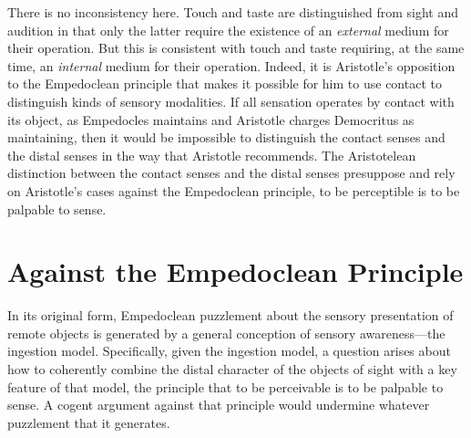 There is no inconsistency here. Touch and taste are distinguished from sight and audition in that only the latter require the existence of an \emph{external} medium for their operation. But this is consistent with touch and taste requiring, at the same time, an \emph{internal} medium for their operation. Indeed, it is Aristotle's opposition to the Empedoclean principle that makes it possible for him to use contact to distinguish kinds of sensory modalities. If all sensation operates by contact with its object, as Empedocles maintains and Aristotle charges Democritus as maintaining, then it would be impossible to distinguish the contact senses and the distal senses in the way that Aristotle recommends. The Aristotelean distinction between the contact senses and the distal senses presuppose and rely on Aristotle's cases against the Empedoclean principle, to be perceptible is to be palpable to sense.



\section{Against the Empedoclean Principle} %
\label{sec:against_the_empedoclean_principle}

In its original form, Empedoclean puzzlement about the sensory presentation of remote objects is generated by a general conception of sensory awareness---the ingestion model. Specifically, given the ingestion model, a question arises about how to coherently combine the distal character of the objects of sight with a key feature of that model, the principle that to be perceivable is to be palpable to sense. A cogent argument against that principle would undermine whatever puzzlement that it generates. 

